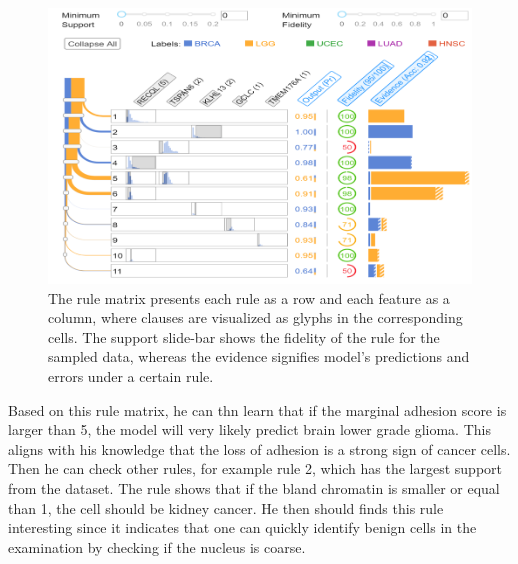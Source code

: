 \begin{figure}[h]
	\centering
	\captionsetup{justification=centering}
		\includegraphics[scale=1.3]{images/decision_rules_explain.png}
	    \caption[Visualization of rules using rule matrix.]{The rule matrix presents each rule as a row and each feature as a column, where clauses are visualized as glyphs in the corresponding cells. The support slide-bar shows the fidelity of the rule for the sampled data, whereas the evidence signifies model's predictions and errors under a certain rule.}
	    \label{fig:decision_rules_explain}
\end{figure}

\hspace*{3.5mm} Based on this rule matrix, he can thn learn that if the marginal adhesion score is larger than 5, the model will very likely predict brain lower grade glioma. This aligns with his knowledge that the loss of adhesion is a strong sign of cancer cells. Then he can check other rules, for example rule 2, which has the largest support from the dataset. The rule shows that if the bland chromatin is smaller or equal than 1, the cell should be kidney cancer. He then should finds this rule interesting since it indicates that one can quickly identify benign cells in the examination by checking if the nucleus is coarse. 

